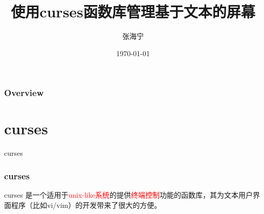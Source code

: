 \documentclass{beamer}
\title[curses]{使用curses函数库管理基于文本的屏幕} %
\author{张海宁} %
\institute[贵大计算机] %
{
贵州大学 \\ %
\medskip
\textit{hnzhang1@gzu.edu.cn} %
}
\date{\today} %
\begin{document}
\begin{frame}
\titlepage %
\end{frame}

\begin{frame}
\frametitle{Overview} %
\tableofcontents %
\end{frame}


\section{curses} %
\begin{frame}
\Huge{\centerline{curses}}
\end{frame}
\begin{frame}
\frametitle{curses}
curses 是一个适用于\textcolor{red}{unix-like系统}的提供\textcolor{red}{终端控制}功能的函数库，其为文本用户界面程序（比如vi/vim）的开发带来了很大的方便。

\end{frame}
\end{document}
